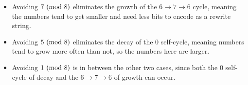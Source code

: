 \begin{itemize}
    \item Avoiding $7 \ (\mathrm{mod}\ 8)$ eliminates the growth of the $6 \rightarrow 7 \rightarrow 6$ cycle, meaning the numbers tend to get smaller and need less bits to encode as a rewrite string.
    \item Avoiding $5 \ (\mathrm{mod}\ 8)$ eliminates the decay of the 0 self-cycle, meaning numbers tend to grow more often than not, so the numbers here are larger.
    \item Avoiding $1 \ (\mathrm{mod}\ 8)$ is in between the other two cases, since both the 0 self-cycle of decay and the $6 \rightarrow 7 \rightarrow 6$ of growth can occur.
\end{itemize}
